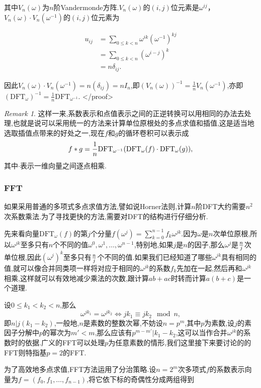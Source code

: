 \documentclass{ctexart}
\theoremstyle{remark}
\newtheorem{remark}{Remark}
\theoremstyle{definition}
\begin{document}
其中$V_n(\omega)$为$n$阶Vandermonde方阵.$V_n(\omega)$的$(i, j)$位元素是$\omega^{ij}$，$V_n(\omega)\cdot V_n(\omega^{-1})$的$(i, j)$位元素为

\begin{align*}
u_{ij}&=\sum_{0\le k<n}\omega^{ik}(\omega^{-1})^{kj}\\
&=\sum_{0\le k<n}(\omega^{i-j})^k\\
&=n\delta_{ij}.
\end{align*}

因此$V_n(\omega)\cdot V_n(\omega^{-1})=n(\delta_{ij})=nI_n$,即$(V_n(\omega))^{-1}=\frac{1}{n}V_n(\omega^{-1})$,亦即$(\mathrm{DFT}_\omega)^{-1}=\frac{1}{n}\mathrm{DFT}_{\omega^{-1}}$.
</proof>
\begin{remark}
这样一来,系数表示和点值表示之间的正逆转换可以用相同的办法去处理,也就是说可以采用统一的方法来计算单位原根处的多点求值和插值,这是适当地选取插值点带来的好处之一,现在$f$和$g$的循环卷积可以表示成$$f*g={1\over n}\mathrm{DFT}_{\omega^{-1}}(\mathrm{DFT}_\omega(f)\cdot \mathrm{DFT}_\omega(g)),$$其中$\cdot$表示一维向量之间逐点相乘.
\end{remark}

\subsubsection{FFT}

如果采用普通的多项式多点求值方法,譬如说Horner法则,计算$n$阶DFT大约需要$n^2$次系数乘法.为了寻找更快的方法,需要对DFT的结构进行仔细分析.

先来看向量$\mathrm{DFT}_\omega(f)$的第$j$个分量$f(\omega^j)=\sum\limits_{k=0}^{n-1}f_k\omega^{jk}$.因为$\omega$是$n$次单位原根,所以$\omega^{jk}$至多只有$n$个不同的值$\omega^0,\omega^1,\ldots,\omega^{n-1}$,特别地,如果$j$是$n$的因子,那么$\omega^j$是${n\over j}$次单位根,因此$(\omega^j)^k$至多只有${n\over j}$个不同的值.如果我们已经知道了哪些$\omega^{jk}$具有相同的值,就可以像合并同类项一样将对应于相同的$\omega^{jk}$的系数$f_k$先加在一起,然后再和$\omega^{jk}$相乘,这样就可以有效地减少乘法的次数,跟计算$ab+ac$时转而计算$a(b+c)$是一个道理.

设$0\le k_1<k_2<n$,那么$$\omega^{jk_1}=\omega^{jk_2}\Leftrightarrow jk_1\equiv jk_2\mod n,$$即$n|j(k_1-k_2)$,一般地,$n$是素数的整数次幂,不妨设$n=p^m$,其中$p$为素数,设$j$的素因子分解中$p$的幂次为$m'<m$,那么应该有$p^{m-m'}|k_1-k_2$,这可以当作合并$\omega^{jk}$的系数时的依据.广义的FFT可以处理$p$为任意素数的情形,我们这里接下来要讨论的的FFT则特指基$p=2$的FFT.

为了高效地多点求值,FFT方法运用了分治策略.设$n=2^m$次多项式$f$的系数表示向量为$f=(f_0,f_1,\ldots,f_{n-1})$,将它依下标的奇偶性分成两组得到
\end{document}
